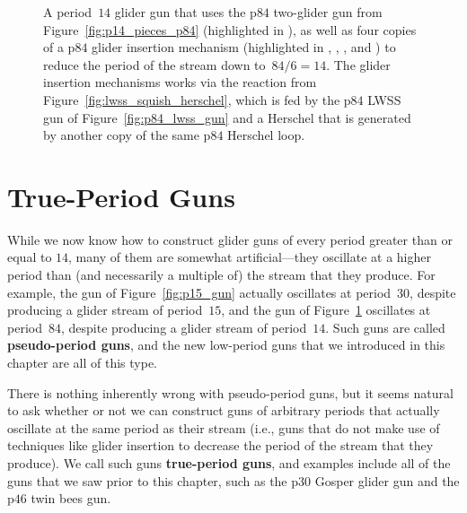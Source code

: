 \begin{figure}[!htbp]
	\centering
	\caption{A period~$14$ glider gun that uses the p$84$ two-glider gun from Figure~\ref{fig:p14_pieces_p84} (highlighted in ), as well as four copies of a p$84$ glider insertion mechanism (highlighted in , , , and ) to reduce the period of the stream down to~$84/6 = 14$. The glider insertion mechanisms works via the reaction from Figure~\ref{fig:lwss_squish_herschel}, which is fed by the p$84$ LWSS gun of Figure~\ref{fig:p84_lwss_gun} and a Herschel that is generated by another copy of the same p$84$ Herschel loop.}\label{fig:p14_gun}
\end{figure}



\section{True-Period Guns}\label{sec:true_period_guns}

While we now know how to construct glider guns of every period greater than or equal to $14$, many of them are somewhat artificial---they oscillate at a higher period than (and necessarily a multiple of) the stream that they produce. For example, the gun of Figure~\ref{fig:p15_gun} actually oscillates at period~$30$, despite producing a glider stream of period~$15$, and the gun of Figure~\ref{fig:p14_gun} oscillates at period~$84$, despite producing a glider stream of period~$14$. Such guns are called \textbf{pseudo-period guns}, and the new low-period guns that we introduced in this chapter are all of this type.

There is nothing inherently wrong with pseudo-period guns, but it seems natural to ask whether or not we can construct guns of arbitrary periods that actually oscillate at the same period as their stream (i.e., guns that do not make use of techniques like glider insertion to decrease the period of the stream that they produce). We call such guns \textbf{true-period guns}, and examples include all of the guns that we saw prior to this chapter, such as the p$30$ Gosper glider gun and the p$46$ twin bees gun.

